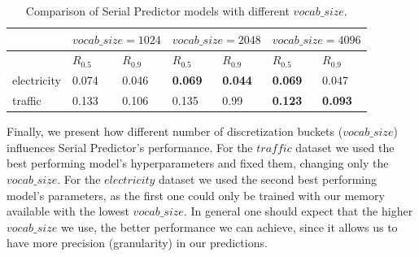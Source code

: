\documentclass[en]{pracamgr}
\begin{document}


\begin{table}[h]
	\begin{center}
		\begin{tabular}
			{ |p{2cm}|p{1.5cm}|p{1.5cm}||p{1.5cm}|p{1.5cm}||p{1.5cm}|p{1.5cm}|   }
			\hline
			& \multicolumn{2}{c||}{$vocab\_size=1024$} & \multicolumn{2}{|c|}{$vocab\_size=2048$} & \multicolumn{2}{|c|}{$vocab\_size=4096$} \\
			\hline
			& \hfil $R_{0.5}$ & \hfil $R_{0.9}$ & \hfil $R_{0.5}$ & \hfil $R_{0.9} $ & \hfil $R_{0.5}$ & \hfil $R_{0.9} $
			\\
			\hline
			electricity & \hfil 0.074   & \hfil 0.046    & \hfil \textbf{0.069} &   \hfil \textbf{0.044} & \hfil \textbf{0.069} &   \hfil 0.047 \\
			
			traffic &  \hfil 0.133 &   \hfil 0.106 & 0.135 &   \hfil 0.99 & \textbf{\hfil 0.123} &   \hfil \textbf{0.093} \\
			\hline
		\end{tabular}
		\caption{\label{tab:results}Comparison of Serial Predictor models with different $vocab\_size$.}
	\end{center}
\end{table}

Finally, we present how different number of discretization buckets ($vocab\_size$) influences Serial Predictor's performance. For the $traffic$ dataset we used the best performing model's hyperparameters and fixed them, changing only the $vocab\_size$. For the $electricity$ dataset we used the second best performing model's parameters, as the first one could only be trained with our memory available with the lowest $vocab\_size$. In general one should expect that the higher $vocab\_size$ we use, the better performance we can achieve, since it allows us to have more precision (granularity) in our predictions.
\end{document}
